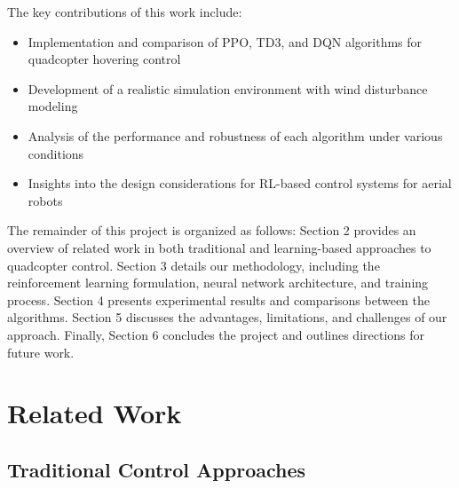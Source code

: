 \documentclass[12pt]{article}
\begin{document}
The key contributions of this work include:
\begin{itemize}
    \item Implementation and comparison of PPO, TD3, and DQN algorithms for quadcopter hovering control
    \item Development of a realistic simulation environment with wind disturbance modeling
    \item Analysis of the performance and robustness of each algorithm under various conditions
    \item Insights into the design considerations for RL-based control systems for aerial robots
\end{itemize}


The remainder of this project is organized as follows: Section 2 provides an overview of related work in both traditional and learning-based approaches to quadcopter control. Section 3 details our methodology, including the reinforcement learning formulation, neural network architecture, and training process. Section 4 presents experimental results and comparisons between the algorithms. Section 5 discusses the advantages, limitations, and challenges of our approach. Finally, Section 6 concludes the project and outlines directions for future work.


\section{Related Work}
\subsection{Traditional Control Approaches}
\end{document}
